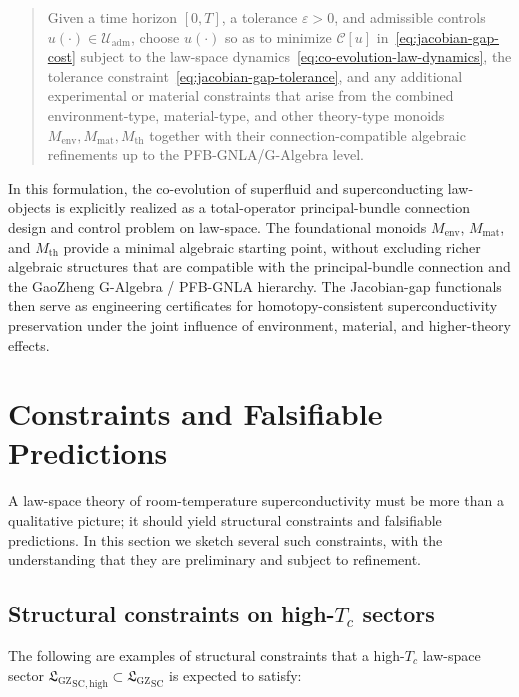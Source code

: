 \documentclass[11pt]{book}
\newcommand{\GZLS}{\ensuremath{\mathfrak{L}_{\mathrm{GZ}}}}
\theoremstyle{plain}
\theoremstyle{definition}
\theoremstyle{remark}
\begin{document}
\begin{quote}
  Given a time horizon $[0,T]$, a tolerance $\varepsilon > 0$, and
  admissible controls $u(\cdot)\in\mathcal{U}_{\mathrm{adm}}$, choose
  $u(\cdot)$ so as to minimize
  $\mathcal{C}[u]$ in~\eqref{eq:jacobian-gap-cost} subject to the
  law-space dynamics~\eqref{eq:co-evolution-law-dynamics}, the tolerance
  constraint~\eqref{eq:jacobian-gap-tolerance}, and any additional
  experimental or material constraints that arise from the combined
  environment-type, material-type, and other theory-type monoids
  $M_{\mathrm{env}}, M_{\mathrm{mat}}, M_{\mathrm{th}}$ together with
  their connection-compatible algebraic refinements up to the
  PFB-GNLA/G-Algebra level.
\end{quote}

In this formulation, the co-evolution of superfluid and superconducting
law-objects is explicitly realized as a total-operator principal-bundle
connection design and control problem on law-space. The foundational
monoids $M_{\mathrm{env}}$, $M_{\mathrm{mat}}$, and $M_{\mathrm{th}}$
provide a minimal algebraic starting point, without excluding richer
algebraic structures that are compatible with the principal-bundle
connection and the GaoZheng G-Algebra / PFB-GNLA hierarchy. The
Jacobian-gap functionals then serve as engineering certificates for
homotopy-consistent superconductivity preservation under the joint
influence of environment, material, and higher-theory effects.

\section{Constraints and Falsifiable Predictions}
\label{sec:constraints-falsifiable}


A law-space theory of room-temperature superconductivity must be
more than a qualitative picture; it should yield structural
constraints and falsifiable predictions. In this section we sketch
several such constraints, with the understanding that they are
preliminary and subject to refinement.

\subsection*{Structural constraints on high-$T_c$ sectors}

The following are examples of structural constraints that a
high-$T_c$ law-space sector ${\GZLS}_{\mathrm{SC,high}} \subset
{\GZLS}_{\mathrm{SC}}$ is expected to satisfy:
\end{document}
